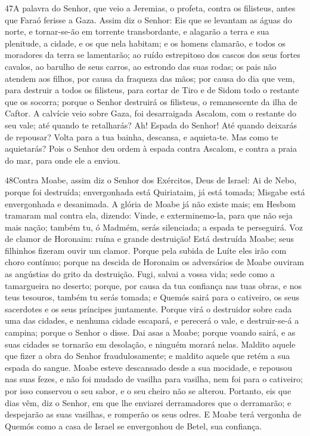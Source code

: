 \medskip

\lettrine{47} A palavra do Senhor, que veio a Jeremias, o
profeta, contra os filisteus, antes que Faraó ferisse a Gaza.
Assim diz o Senhor: Eis que se levantam as águas do norte, e
tornar-se-ão em torrente transbordante, e alagarão a terra e sua
plenitude, a cidade, e os que nela habitam; e os homens clamarão, e
todos os moradores da terra se lamentarão; ao ruído estrepitoso
dos cascos dos seus fortes cavalos, ao barulho de seus carros, ao
estrondo das suas rodas; os pais não atendem aos filhos, por causa
da fraqueza das mãos; por causa do dia que vem, para destruir a
todos os filisteus, para cortar de Tiro e de Sidom todo o restante
que os socorra; porque o Senhor destruirá os filisteus, o
remanescente da ilha de Caftor. A calvície veio sobre Gaza, foi
desarraigada Ascalom, com o restante do seu vale; até quando te
retalharás? Ah! Espada do Senhor! Até quando deixarás de
repousar? Volta para a tua bainha, descansa, e aquieta-te. Mas
como te aquietarás? Pois o Senhor deu ordem à espada contra Ascalom,
e contra a praia do mar, para onde ele a enviou.

\medskip

\lettrine{48} Contra Moabe, assim diz o Senhor dos Exércitos,
Deus de Israel: Ai de Nebo, porque foi destruída; envergonhada está
Quiriataim, já está tomada; Misgabe está envergonhada e desanimada.
A glória de Moabe já não existe mais; em Hesbom tramaram mal
contra ela, dizendo: Vinde, e exterminemo-la, para que não seja mais
nação; também tu, ó Madmém, serás silenciada; a espada te
perseguirá. Voz de clamor de Horonaim: ruína e grande
destruição! Está destruída Moabe; seus filhinhos fizeram ouvir
um clamor. Porque pela subida de Luíte eles irão com choro
contínuo; porque na descida de Horonaim os adversários de Moabe
ouviram as angústias do grito da destruição. Fugi, salvai a
vossa vida; sede como a tamargueira no deserto; porque, por
causa da tua confiança nas tuas obras, e nos teus tesouros, também
tu serás tomada; e Quemós sairá para o cativeiro, os seus sacerdotes
e os seus príncipes juntamente. Porque virá o destruidor sobre
cada uma das cidades, e nenhuma cidade escapará, e perecerá o vale,
e destruir-se-á a campina; porque o Senhor o disse. Dai asas a
Moabe; porque voando sairá, e as suas cidades se tornarão em
desolação, e ninguém morará nelas. Maldito aquele que fizer a
obra do Senhor fraudulosamente; e maldito aquele que retém a sua
espada do sangue. Moabe esteve descansado desde a sua
mocidade, e repousou nas suas fezes, e não foi mudado de vasilha
para vasilha, nem foi para o cativeiro; por isso conservou o seu
sabor, e o seu cheiro não se alterou. Portanto, eis que dias
vêm, diz o Senhor, em que lhe enviarei derramadores que o
derramarão; e despejarão as suas vasilhas, e romperão os seus odres.
E Moabe terá vergonha de Quemós como a casa de Israel se
envergonhou de Betel, sua confiança.


